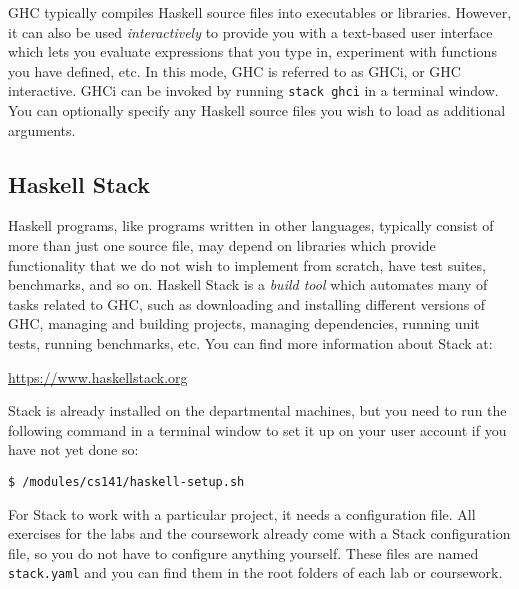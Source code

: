 GHC typically compiles Haskell source files into executables or libraries. However, it can also be used \emph{interactively} to provide you with a text-based user interface which lets you evaluate expressions that you type in, experiment with functions you have defined, etc. In this mode, GHC is referred to as GHCi, or GHC interactive. GHCi can be invoked by running \texttt{\small stack ghci} in a terminal window. You can optionally specify any Haskell source files you wish to load as additional arguments.

\subsection{Haskell Stack} 
\label{sec:stack}

Haskell programs, like programs written in other languages, typically consist of more than just one source file, may depend on libraries which provide functionality that we do not wish to implement from scratch, have test suites, benchmarks, and so on. Haskell Stack is a \emph{build tool} which automates many of tasks related to GHC, such as downloading and installing different versions of GHC, managing and building projects, managing dependencies, running unit tests, running benchmarks, etc. You can find more information about Stack at:
\begin{center}
	\url{https://www.haskellstack.org}
\end{center}
Stack is already installed on the departmental machines, but you need to run the following command in a terminal window to set it up on your user account if you have not yet done so:
\begin{verbatim}
$ /modules/cs141/haskell-setup.sh
\end{verbatim}
For Stack to work with a particular project, it needs a configuration file. All exercises for the labs and the coursework already come with a Stack configuration file, so you do not have to configure anything yourself. These files are named \texttt{\small stack.yaml} and you can find them in the root folders of each lab or coursework.

